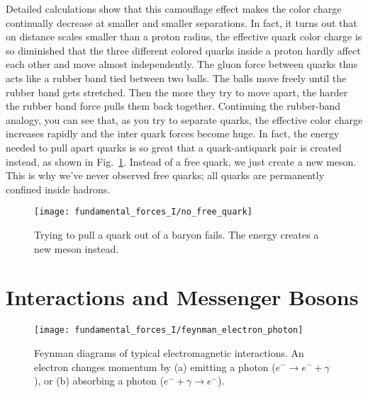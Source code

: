 Detailed calculations show that this camouflage effect makes the color
charge continually decrease at smaller and smaller separations.  In
fact, it turns out that on distance scales smaller than a proton
radius, the effective quark color charge is so diminished that the
three different colored quarks inside a proton hardly affect each
other and move almost independently. The gluon force between quarks
thus acts like a rubber band tied between two balls.  The balls move
freely until the rubber band gets stretched.  Then the more they try to
move apart, the harder the rubber band force pulls them back together.
Continuing the rubber-band analogy, you can see that, as you try to
separate quarks, the effective color charge increases rapidly and the
inter quark forces become huge.  In fact, the energy needed to pull
apart quarks is so great that a quark-antiquark pair is created
instead, as shown in Fig.~\ref{fig:no_free_quark}. Instead of a free
quark, we just create a new meson.  This is why we've never observed
free quarks; all quarks are permanently confined inside hadrons.

\begin{figure}[tbp]
\begin{center}
\texttt{[image: fundamental\_forces\_I/no\_free\_quark]}
\caption{Trying to pull a quark out of a baryon fails.  The energy
  creates a new meson instead.}
\label{fig:no_free_quark}
\end{center}
\end{figure}

\section{Interactions and Messenger Bosons}

\begin{figure}[!b]
\begin{center}
\begin{minipage}{10cm}
\begin{center}
\texttt{[image: fundamental\_forces\_I/feynman\_electron\_photon]}
\caption{Feynman diagrams of typical electromagnetic interactions.
An electron changes momentum by (a) emitting a photon ($e^- \rightarrow
e^- + \gamma$), or (b) absorbing a photon ($e^- + \gamma \rightarrow e^-$).} 
\label{fig:feynman_electron_photon}
\end{center}
\end{minipage}
\end{center}
\end{figure}


